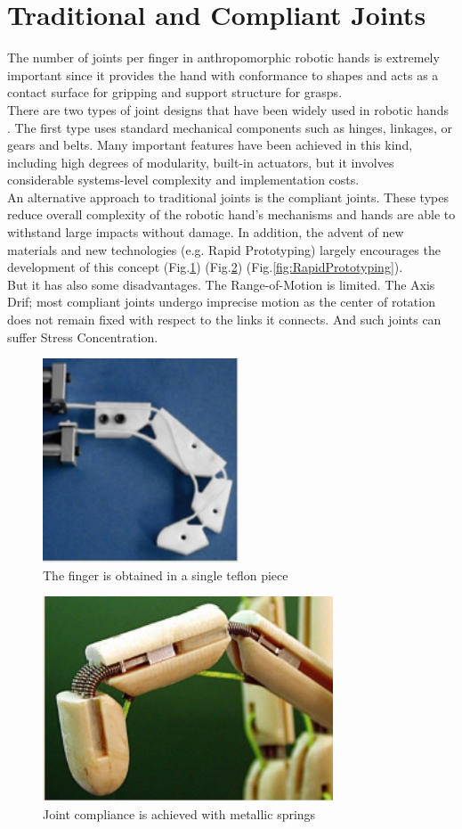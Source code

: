 \documentclass[a4paper, 10pt, conference]{ieeeconf}      %
\begin{document}
\section{\textbf{Traditional and Compliant Joints}}
The number of joints per finger in anthropomorphic robotic hands is extremely important since it provides the hand with conformance to shapes and acts as a contact surface for gripping and support structure for grasps.\\
There are two types of joint designs that have been widely used in robotic hands \cite{siciliano2016springer}. The first type uses standard mechanical components such as hinges, linkages, or gears and belts. Many important features have been achieved in this kind, including high degrees of modularity, built-in actuators, but it involves considerable systems-level complexity and implementation costs.\\
An alternative approach to traditional joints is the compliant joints. These types reduce overall complexity of the robotic hand's mechanisms and hands are able to withstand large impacts without damage. In addition, the advent of new materials and new technologies (e.g. Rapid Prototyping) largely encourages the development of this concept (Fig.\ref{fig:teflon}) (Fig.\ref{fig:springs}) (Fig.\ref{fig:RapidPrototyping}).\\
But it has also some disadvantages. The Range-of-Motion is limited. The Axis Drif; most compliant joints undergo imprecise motion as the center of rotation does not remain fixed with respect to the links it connects. And such joints can suffer Stress Concentration.\\
\begin{figure}[h!]
\centering  \includegraphics[scale=0.7]{./images/teflon}
  \caption{The finger is obtained in a single teflon piece}
  \label{fig:teflon}
	\end{figure}
\begin{figure}[h!]
\centering  \includegraphics[scale=0.6]{./images/springs}
  \caption{Joint compliance is achieved with metallic springs}
  \label{fig:springs}
	\end{figure}
\end{document}
